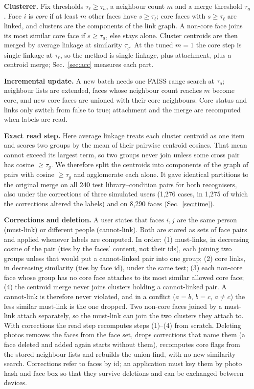 \documentclass[conference]{IEEEtran}
\begin{document}
\textbf{Clusterer.} Fix thresholds $\tau_\ell\ge\tau_a$, a neighbour count $m$ and a merge threshold $\tau_g$. Face $i$ is
\emph{core} if at least $m$ other faces have $s\ge\tau_\ell$; core faces with $s\ge\tau_\ell$ are linked, and clusters are
the components of the link graph. A non-core face joins its most similar core face if $s\ge\tau_a$, else stays alone.
Cluster centroids are then merged by average linkage at similarity $\tau_g$. At the tuned $m=1$ the core step is single
linkage at $\tau_\ell$, so the method is single linkage, plus attachment, plus a centroid merge; Sec.~\ref{sec:acc} measures each part.

\textbf{Incremental update.} A new batch needs one FAISS range search at $\tau_a$; neighbour lists are extended, faces whose neighbour
count reaches $m$ become core, and new core faces are unioned with their core neighbours. Core status and links only switch from
false to true; attachment and the merge are recomputed when labels are read.

\textbf{Exact read step.} Here average linkage treats each cluster centroid as one item and scores two groups by the mean of their
pairwise centroid cosines. That mean cannot exceed its largest term, so two groups never join unless some cross pair has cosine
$\ge\tau_g$. We therefore split the centroids into components of the graph of pairs with cosine $\ge\tau_g$ and agglomerate
each alone. It gave identical partitions to the
original merge on all 240 test library--condition pairs for both recognisers, also under the corrections of three simulated users
(1{,}276 cases, in 1{,}275 of which the corrections altered the labels) and on 8{,}290 faces (Sec.~\ref{sec:time}).

\textbf{Corrections and deletion.} A user states that faces $i,j$ are the same person (must-link) or different people
(cannot-link). Both are stored as sets of face pairs and applied whenever labels are computed. In order: (1) must-links, in
decreasing cosine of the pair (ties by the faces' content, not their ids), each joining two groups unless that would put a
cannot-linked pair into one group; (2) core links, in decreasing similarity (ties by face id), under the same test; (3) each non-core face
whose group has no core face attaches to its most similar allowed core face; (4) the centroid merge never joins clusters
holding a cannot-linked pair. A cannot-link is therefore never violated, and in a conflict ($a{=}b$, $b{=}c$, $a{\ne}c$) the
less similar must-link is the one dropped. Two non-core faces joined by a must-link attach separately, so the must-link
can join the two clusters they attach to. With corrections the read step recomputes steps (1)--(4) from scratch. Deleting photos removes the faces from the face set, drops corrections that name
them (a face deleted and added again starts without them), recomputes core flags from the stored neighbour lists and rebuilds the union-find, with no new similarity search. Corrections
refer to faces by id; an application must key them by photo hash and face box so that they survive deletions and can be exchanged
between devices.
\end{document}
